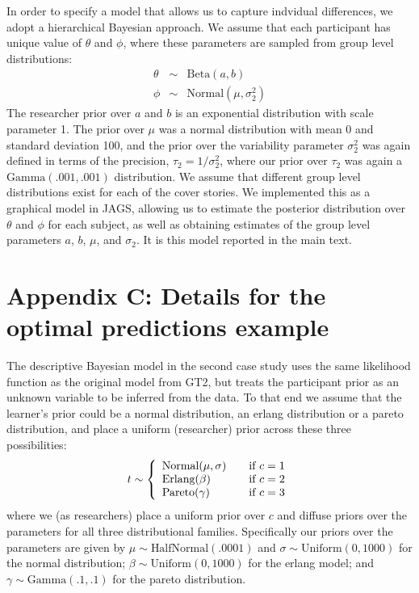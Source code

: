 In order to specify a model that allows us to capture indvidual differences, we adopt a hierarchical Bayesian approach. We assume that each participant has unique value of $\theta$ and $\phi$, where these parameters are sampled from group level distributions: 
\begin{equation}
\begin{array}{rcl}
\theta & \sim & \mbox{Beta}(a,b) \\
\phi & \sim & \mbox{Normal}(\mu,\sigma_2^2) 
\end{array}
\end{equation} 
The researcher prior over $a$ and $b$ is an exponential distribution with scale parameter 1. The prior over $\mu$ was a normal distribution with mean 0 and standard deviation 100, and the prior over the variability parameter $\sigma_2^2$ was again defined in terms of the precision, $\tau_2 = 1/\sigma_2^2$, where our prior over $\tau_2$ was again a $\mbox{Gamma}(.001,.001)$ distribution. We assume that different group level distributions exist for each of the cover stories. We implemented this as a graphical model in JAGS, allowing us to estimate the posterior distribution over $\theta$ and $\phi$ for each subject, as well as obtaining estimates of the group level parameters $a$, $b$, $\mu$, and $\sigma_2$. It is this model reported in the main text.

\section*{Appendix C: Details for the optimal predictions example}

The descriptive Bayesian model in the second case study uses the same likelihood function as the original model from GT2, but treats the participant prior as an unknown variable to be inferred from the data. To that end we assume that the learner's prior could be a normal distribution, an erlang distribution or a pareto distribution, and place a uniform (researcher) prior across these three possibilities:
\begin{equation}
t \sim \left\{ 
  \begin{array}{l l}
    \mbox{Normal}( \mu , \sigma ) & \quad \text{if $c=1$}\\
    \mbox{Erlang}( \beta ) & \quad \text{if $c=2$}\\
    \mbox{Pareto}( \gamma) & \quad \text{if $c=3$}
  \end{array} \right.
\end{equation}
where we (as researchers) place a uniform prior over $c$ and diffuse priors over the parameters for all three distributional families. Specifically our priors over the parameters are given by $\mu \sim \mbox{HalfNormal}(.0001)$ and $\sigma \sim \mbox{Uniform}(0,1000)$ for the normal distribution; $\beta \sim  \mbox{Uniform}(0,1000)$ for the erlang model; and $\gamma \sim \mbox{Gamma}(.1,.1)$ for the pareto distribution. 

